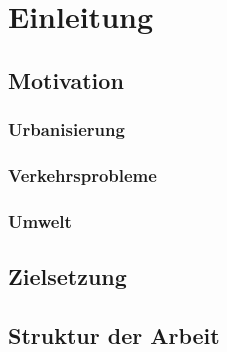 \section{Einleitung}
\subsection{Motivation}
\subsubsection{Urbanisierung}
\subsubsection{Verkehrsprobleme}
\subsubsection{Umwelt}
\subsection{Zielsetzung}
\subsection{Struktur der Arbeit}